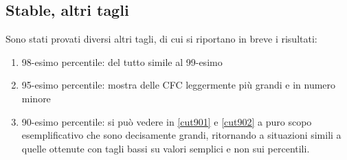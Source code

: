 \documentclass[10pt,a4paper]{article}
\begin{document}
\subsection{Stable, altri tagli}
Sono stati provati diversi altri tagli, di cui si riportano in breve i risultati:
\begin{enumerate}
\item 98-esimo percentile: del tutto simile al 99-esimo
\item 95-esimo percentile: mostra delle CFC leggermente più grandi e in numero minore
\item 90-esimo percentile: si può vedere in \ref{cut901} e \ref{cut902} a puro scopo esemplificativo che sono decisamente grandi, ritornando a situazioni simili a quelle ottenute con tagli bassi su valori semplici e non sui percentili.
\end{enumerate}
\end{document}
